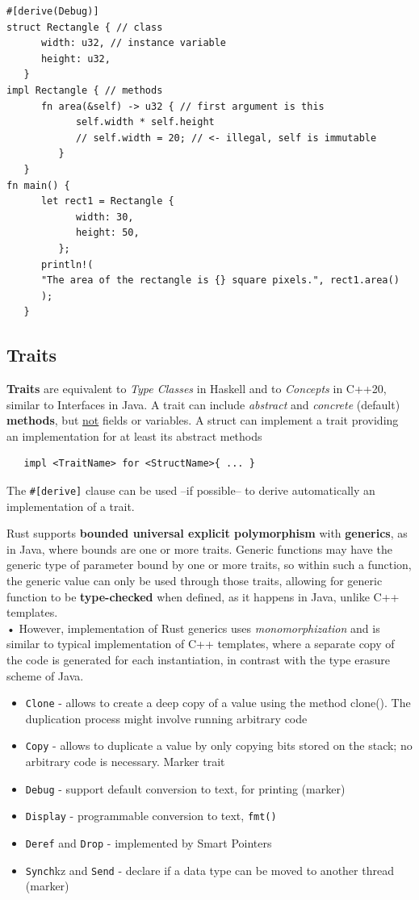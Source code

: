 \begin{lstlisting}
#[derive(Debug)]
struct Rectangle { // class
      width: u32, // instance variable
      height: u32,
   }
impl Rectangle { // methods
      fn area(&self) -> u32 { // first argument is this
            self.width * self.height
            // self.width = 20; // <- illegal, self is immutable
         }
   }
fn main() {
      let rect1 = Rectangle {
            width: 30,
            height: 50,
         };
      println!(
      "The area of the rectangle is {} square pixels.", rect1.area()
      );
   }
\end{lstlisting}

\subsection{Traits}
\textbf{Traits} are equivalent to \textit{Type Classes} in Haskell and to \textit{Concepts} in
C++20, similar to Interfaces in Java.
A trait can include \textit{abstract} and \textit{concrete} (default)
\textbf{methods}, but \underline{not} fields or variables.
A struct can implement a trait providing an
implementation for at least its abstract methods
\begin{lstlisting}
   impl <TraitName> for <StructName>{ ... }
\end{lstlisting}

The \lstinline|#[derive]| clause can be used {--}if possible{--} to derive
automatically an implementation of a trait.
\nl

Rust supports \textbf{bounded universal explicit polymorphism}
with \textbf{generics}, as in Java, where bounds are one or
more traits. 
Generic functions may have the generic type of parameter
bound by one or more traits, so within such a function, the
generic value can only be used through those traits,
allowing for generic function to be \textbf{type-checked} when
defined, as it happens in Java, unlike C++ templates.\\
• However, implementation of Rust generics uses \textit{monomorphization} and is similar to
typical implementation of C++ templates, where a separate copy
of the code is generated for each instantiation, in contrast with the
type erasure scheme of Java.
\begin{itemize}
	\item \texttt{Clone} - allows to create a deep copy of a value using the method
clone(). The duplication process might involve running arbitrary
code
	\item \texttt{Copy} - allows to duplicate a value by only copying bits stored on the
stack; no arbitrary code is necessary. Marker trait
	\item \texttt{Debug} - support default conversion to text, for printing (marker)
	\item \texttt{Display} - programmable conversion to text, \lstinline|fmt()|
	\item \texttt{Deref} and \texttt{Drop} - implemented by Smart Pointers
	\item \texttt{Synch}kz and \texttt{Send} - declare if a data type can be moved to another
thread (marker)
\end{itemize}

